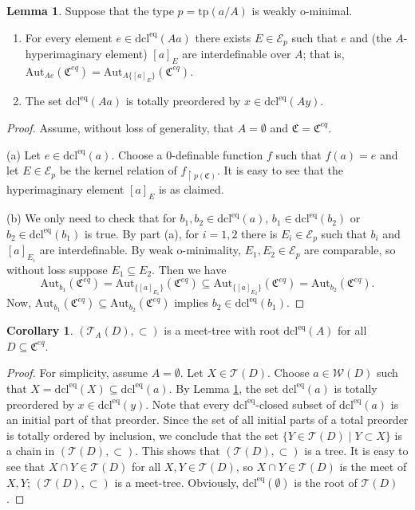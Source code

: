 \documentclass{amsart}
\theoremstyle{definition}
\newtheorem{Lemma}[Theorem]{Lemma}
\newtheorem{Corollary}[Theorem]{Corollary}
\theoremstyle{definition}
\def\strok{\restriction}
\newcommand{\Mon}{\mathfrak C}
\newcommand{\Moneq}{\mathfrak C^{eq}}
\newcommand{\tp}{\mathrm{tp}}
\newcommand{\dcleq}{\mathrm{dcl^{eq}}}
\newcommand{\Aut}{\mathrm{Aut}}
\begin{document}
 
\begin{Lemma}\label{Lemma_wom_dcl_is_linear}
Suppose that the type $p=\tp(a/A)$ is weakly o-minimal. 
\begin{enumerate}[\hspace{10pt}(a)] 
\item For every element $e\in\dcleq (Aa)$ there exists $E\in\mathcal E_p$ such that $e$ and (the $A$-hyperimaginary element) $[a]_E$ are interdefinable over $A$; that is, $\Aut_{Ae}(\Moneq)=\Aut_{A\{[a]_E\}}(\Moneq)$. 
\item The set $\dcleq(Aa)$ is totally preordered by $x\in\dcleq(Ay)$.
\end{enumerate}
\end{Lemma}
\begin{proof} Assume, without loss of generality, that $A=\emptyset$ and $\Mon=\Moneq$.

(a) Let $e\in\dcleq(a)$. Choose a $0$-definable function $f$ such that $f(a)=e$ and let $E\in\mathcal E_p$ be the kernel relation of $f_{\strok p(\Mon)}$. It is easy to see that the hyperimaginary element $[a]_E$ is as claimed.  

(b) We only need to check that for $b_1,b_2\in\dcleq(a)$, $b_1\in\dcleq(b_2)$ or $b_2\in\dcleq(b_1)$ is true. By part (a), for $i=1,2$ there is $E_i\in \mathcal E_p$ such that $b_i$ and $[a]_{E_i}$ are interdefinable. By weak o-minimality, $E_1,E_2\in \mathcal E_p$ are comparable, so without loss suppose $E_1\subseteq E_2$. Then we have 
$$\Aut_{b_1}(\Moneq)= \Aut_{\{[a]_{E_1}\}}(\Moneq)\subseteq \Aut_{\{[a]_{E_2}\}}(\Moneq) =\Aut_{b_2}(\Moneq).$$
Now, $\Aut_{b_1}(\Moneq) \subseteq \Aut_{b_2}(\Moneq)$ 
implies $b_2\in \dcleq (b_1)$. 
\end{proof}




\begin{Corollary}\label{Corollary_meet_tree}
$(\mathcal T_A(D),\subset)$ is a meet-tree with root $\dcleq(A)$ for all $D\subseteq \Moneq$.  \end{Corollary}
\begin{proof} 
For simplicity, assume $A=\emptyset$. 
Let $X\in \mathcal T(D)$. Choose $a\in \mathcal W(D)$ such that $X=\dcleq(X)\subseteq \dcleq(a)$. By Lemma \ref{Lemma_wom_dcl_is_linear}, the set $\dcleq(a)$ is totally preordered by $x\in\dcleq(y)$. Note that every $\dcleq$-closed subset of $\dcleq(a)$ is an initial part of that preorder. Since the set of all initial parts of a total preorder is totally ordered by inclusion, we conclude that the set $\{Y\in \mathcal T(D)\mid Y\subset X\}$ is a chain in $(\mathcal T(D),\subset)$. This shows that $(\mathcal T(D),\subset)$ is a tree. 
It is easy to see that $X\cap Y\in \mathcal T(D)$ for all $X,Y\in\mathcal T(D)$, so $X\cap Y\in \mathcal T(D)$ is the meet of $X,Y$; $(\mathcal T(D),\subset)$ is a meet-tree. Obviously, $\dcleq(\emptyset)$ is the root of $\mathcal T(D)$.  
\end{proof}
\end{document}
